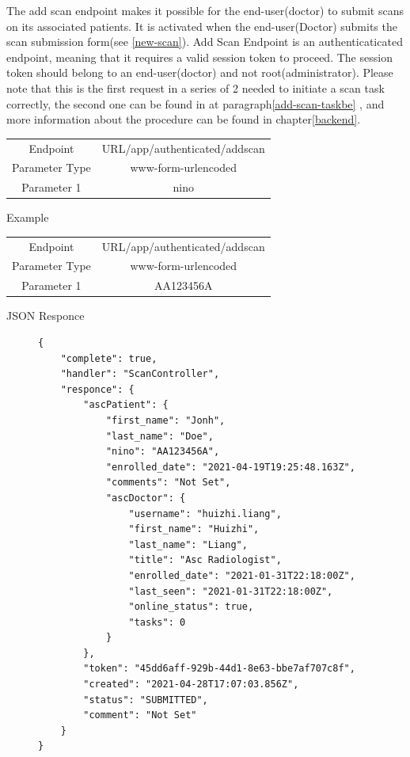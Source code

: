 					
					The add scan endpoint makes it possible for the end-user(doctor) to submit scans on its associated patients. It is activated when 
					the end-user(Doctor) submits the scan submission form(see \ref{new-scan}). Add Scan Endpoint is an authenticaticated endpoint, meaning that it requires a 
					valid session token to proceed. The session token should belong to an end-user(doctor) and not root(administrator). Please note that 
					this is the first request in a series of 2 needed to initiate a scan task correctly, the second one can be found in at paragraph\ref{add-scan-taskbe} , and 
					more information about the procedure can be found in chapter\ref{backend}.
					\begin{center}
						\begin{tabular}{ |c|c| } 
							\hline
							Endpoint & {{URL}}/app/authenticated/addscan\\
							Parameter Type & www-form-urlencoded  \\
							Parameter 1 & nino  \\
							\hline
						\end{tabular}
					\end{center}
					Example
					\begin{center}
						\begin{tabular}{ |c|c| } 
							\hline
							Endpoint & {{URL}}/app/authenticated/addscan\\
							Parameter Type & www-form-urlencoded  \\
							Parameter 1 & AA123456A  \\
							\hline
						\end{tabular}
					\end{center}
					JSON Responce
					\begin{figure}[H]
						\iftrue
						\begin{lstlisting}[]
{
	"complete": true,
	"handler": "ScanController",
	"responce": {
		"ascPatient": {
			"first_name": "Jonh",
			"last_name": "Doe",
			"nino": "AA123456A",
			"enrolled_date": "2021-04-19T19:25:48.163Z",
			"comments": "Not Set",
			"ascDoctor": {
				"username": "huizhi.liang",
				"first_name": "Huizhi",
				"last_name": "Liang",
				"title": "Asc Radiologist",
				"enrolled_date": "2021-01-31T22:18:00Z",
				"last_seen": "2021-01-31T22:18:00Z",
				"online_status": true,
				"tasks": 0
			}
		},
		"token": "45dd6aff-929b-44d1-8e63-bbe7af707c8f",
		"created": "2021-04-28T17:07:03.856Z",
		"status": "SUBMITTED",
		"comment": "Not Set"
	}
}
						\end{lstlisting}
					\end{figure}

